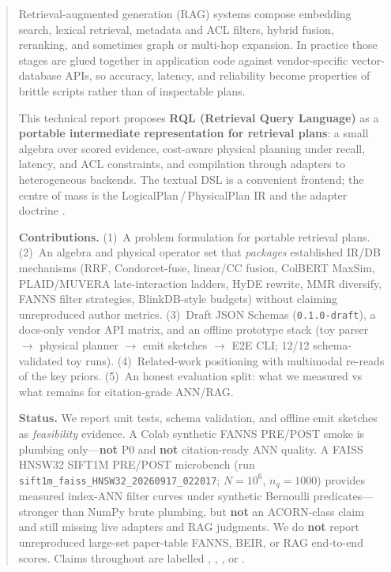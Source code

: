 \begin{abstract}
Retrieval-augmented generation (RAG) systems compose embedding search, lexical retrieval, metadata and ACL filters, hybrid fusion, reranking, and sometimes graph or multi-hop expansion.
In practice those stages are glued together in application code against vendor-specific vector-database APIs, so accuracy, latency, and reliability become properties of brittle scripts rather than of inspectable plans.

This technical report proposes \textbf{RQL (Retrieval Query Language)} as a \textbf{portable intermediate representation for retrieval plans}: a small algebra over scored evidence, cost-aware physical planning under recall, latency, and ACL constraints, and compilation through adapters to heterogeneous backends.
The textual DSL is a convenient frontend; the centre of mass is the LogicalPlan\,/\,PhysicalPlan IR and the adapter doctrine \hypothesis{}.

\textbf{Contributions.}
(1)~A problem formulation for portable retrieval plans.
(2)~An algebra and physical operator set that \emph{packages} established IR/DB mechanisms (RRF, Condorcet-fuse, linear/CC fusion, ColBERT MaxSim, PLAID/MUVERA late-interaction ladders, HyDE rewrite, MMR diversify, FANNS filter strategies, BlinkDB-style budgets) without claiming unreproduced author metrics.
(3)~Draft JSON Schemas (\texttt{0.1.0-draft}), a docs-only vendor API matrix, and an offline prototype stack (toy parser $\rightarrow$ physical planner $\rightarrow$ emit sketches $\rightarrow$ E2E CLI; 12/12 schema-validated toy runs).
(4)~Related-work positioning with multimodal re-reads of the key priors.
(5)~An honest evaluation split: what we measured vs what remains for citation-grade ANN/RAG.

\textbf{Status.}
We report unit tests, schema validation, and offline emit sketches as \emph{feasibility} evidence.
A Colab synthetic FANNS PRE/POST smoke is plumbing only---\textbf{not} P0 and \textbf{not} citation-ready ANN quality.
A FAISS HNSW32 SIFT1M PRE/POST microbench (run \texttt{sift1m\_faiss\_HNSW32\_20260917\_022017}; $N{=}10^6$, $n_q{=}1000$) provides measured index-ANN filter curves under synthetic Bernoulli predicates---stronger than NumPy brute plumbing, but \textbf{not} an ACORN-class claim and still missing live adapters and RAG judgments.
We do \textbf{not} report unreproduced large-set paper-table FANNS, BEIR, or RAG end-to-end scores.
Claims throughout are labelled \established{}, \hypothesis{}, \provisional{}, or \authoronly{}.
\end{abstract}
